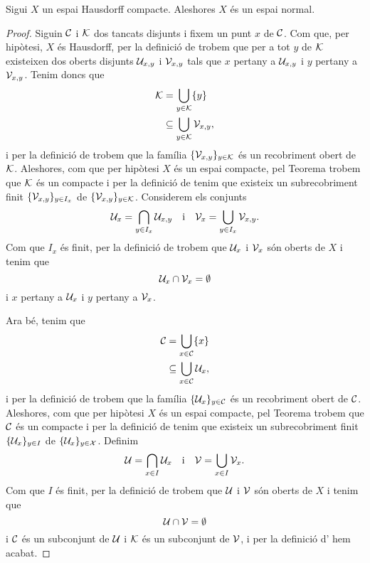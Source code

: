 \documentclass[../Apunts.tex]{subfiles}
\begin{document}
	\begin{theorem}
		\label{thm:els espais Hausdorff compactes són espais normals}
		Sigui \(X\) un espai Hausdorff compacte. Aleshores \(X\) és un espai normal.
		\begin{proof} %
			Siguin \(\mathcal{C}\) i \(\mathcal{K}\) dos tancats disjunts i fixem un punt \(x\) de \(\mathcal{C}\). Com que, per hipòtesi, \(X\) és Hausdorff, per la definició de  trobem que per a tot \(y\) de \(\mathcal{K}\) existeixen dos oberts disjunts \(\mathcal{U}_{x,y}\) i \(\mathcal{V}_{x,y}\) tals que \(x\) pertany a \(\mathcal{U}_{x,y}\) i \(y\) pertany a \(\mathcal{V}_{x,y}\). Tenim doncs que
			\begin{align*}
				\mathcal{K}&=\bigcup_{y\in\mathcal{K}}\{y\} \\
				&\subseteq\bigcup_{y\in\mathcal{K}}\mathcal{V}_{x,y},
			\end{align*}
			i per la definició de  trobem que la família \(\{\mathcal{V}_{x,y}\}_{y\in\mathcal{K}}\) és un recobriment obert de \(\mathcal{K}\). Aleshores, com que per hipòtesi \(X\) és un espai compacte, pel Teorema  trobem que \(\mathcal{K}\) és un compacte i per la definició de  tenim que existeix un subrecobriment finit \(\{\mathcal{V}_{x,y}\}_{y\in I_{x}}\) de \(\{\mathcal{V}_{x,y}\}_{y\in\mathcal{K}}\). Considerem els conjunts
			\[\mathcal{U}_{x}=\bigcap_{y\in I_{x}}\mathcal{U}_{x,y}\quad\text{i}\quad\mathcal{V}_{x}=\bigcup_{y\in I_{x}}\mathcal{V}_{x,y}.\]
			Com que \(I_{x}\) és finit, per la definició de  trobem que \(\mathcal{U}_{x}\) i \(\mathcal{V}_{x}\) són oberts de \(X\) i tenim que
			\[\mathcal{U}_{x}\cap\mathcal{V}_{x}=\emptyset\]
			i \(x\) pertany a \(\mathcal{U}_{x}\) i \(y\) pertany a \(\mathcal{V}_{x}\).
			
			Ara bé, tenim que
			\begin{align*}
				\mathcal{C}&=\bigcup_{x\in\mathcal{C}}\{x\} \\
				&\subseteq\bigcup_{x\in\mathcal{C}}\mathcal{U}_{x},
			\end{align*}
			i per la definició de  trobem que la família \(\{\mathcal{U}_{x}\}_{y\in\mathcal{C}}\) és un recobriment obert de \(\mathcal{C}\). Aleshores, com que per hipòtesi \(X\) és un espai compacte, pel Teorema  trobem que \(\mathcal{C}\) és un compacte i per la definició de  tenim que existeix un subrecobriment finit \(\{\mathcal{U}_{x}\}_{y\in I}\) de \(\{\mathcal{U}_{x}\}_{y\in\mathcal{X}}\). Definim
			\[\mathcal{U}=\bigcap_{x\in I}\mathcal{U}_{x}\quad\text{i}\quad\mathcal{V}=\bigcup_{x\in I}\mathcal{V}_{x}.\]
			Com que \(I\) és finit, per la definició de  trobem que \(\mathcal{U}\) i \(\mathcal{V}\) són oberts de \(X\) i tenim que
			\[\mathcal{U}\cap\mathcal{V}=\emptyset\]
			i \(\mathcal{C}\) és un subconjunt de \(\mathcal{U}\) i \(\mathcal{K}\) és un subconjunt de \(\mathcal{V}\), i per la definició d' hem acabat.
		\end{proof}
	\end{theorem}
\end{document}
